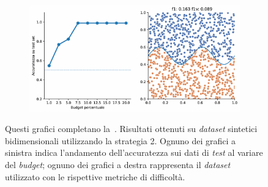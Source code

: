 \begin{appendices}
\begin{figure}[ht]
\begin{subfigure}{.8\textwidth}
    \end{subfigure}%
    \hfill
    \begin{subfigure}{.8\textwidth}
        \centering
        \includegraphics[width=\textwidth]{img/2d_v2/11.pdf}
    \end{subfigure}
    \caption[Risultati su \emph{dataset} sintetici utilizzando la strategia 2.]{Questi grafici completano la~. Risultati ottenuti su \emph{dataset} sintetici bidimensionali utilizzando la strategia 2. Ognuno dei grafici a sinistra indica l'andamento dell'accuratezza sui dati di \emph{test} al variare del \emph{budget}; ognuno dei grafici a destra rappresenta il \emph{dataset} utilizzato con le rispettive metriche di difficoltà.}
\end{figure}



\end{appendices}
